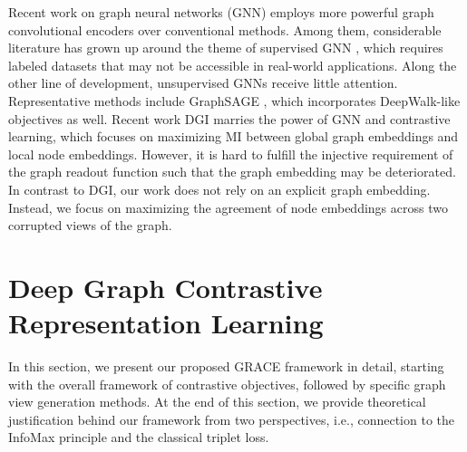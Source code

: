 \documentclass{article}
\theoremstyle{remark}
\begin{document}
Recent work on graph neural networks (GNN) employs more powerful graph convolutional encoders over conventional methods. Among them, considerable literature has grown up around the theme of supervised GNN \cite{Kipf:2016tc,Velickovic:2018we,Hu:2019vq,Wu:2019vz}, which requires labeled datasets that may not be accessible in real-world applications.
Along the other line of development, unsupervised GNNs receive little attention. Representative methods include GraphSAGE \cite{Hamilton:2017tp}, which incorporates DeepWalk-like objectives as well. Recent work DGI \cite{Velickovic:2019tu} marries the power of GNN and contrastive learning, which focuses on maximizing MI between global graph embeddings and local node embeddings. However, it is hard to fulfill the injective requirement of the graph readout function such that the graph embedding may be deteriorated. In contrast to DGI, our work does not rely on an explicit graph embedding. Instead, we focus on maximizing the agreement of node embeddings across two corrupted views of the graph.

 \makeatletter
\def\mathcenterto#1#2{\mathclap{\phantom{#1}\mathclap{#2}}\phantom{#1}}
\let\old@widetilde\widetilde
\def\widetildeto#1#2{\mathcenterto{#2}{\old@widetilde{\mathcenterto{#1}{#2\,}}}}
\let\old@widehat\widehat
\def\widehatto#1#2{\mathcenterto{#2}{\old@widehat{\mathcenterto{#1}{#2\,}}}}
\makeatother
\def\widetilde{\widetildeto{X}}

\section{Deep Graph Contrastive Representation Learning}

In this section, we present our proposed GRACE framework in detail, starting with the overall framework of contrastive objectives, followed by specific graph view generation methods. At the end of this section, we provide theoretical justification behind our framework from two perspectives, i.e., connection to the InfoMax principle and the classical triplet loss.
\end{document}
